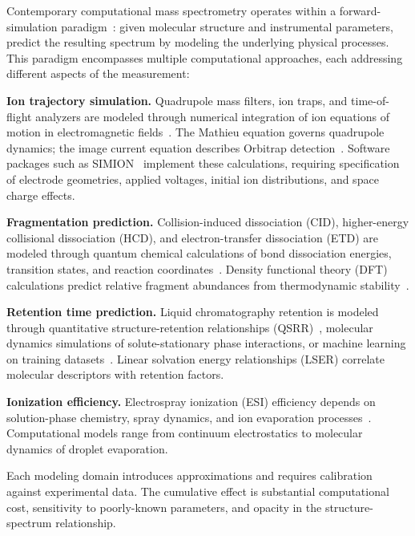 \documentclass[twocolumn,10pt]{article}
\begin{document}
Contemporary computational mass spectrometry operates within a forward-simulation paradigm~\cite{gross2011mass}: given molecular structure and instrumental parameters, predict the resulting spectrum by modeling the underlying physical processes. This paradigm encompasses multiple computational approaches, each addressing different aspects of the measurement:

\textbf{Ion trajectory simulation.} Quadrupole mass filters, ion traps, and time-of-flight analyzers are modeled through numerical integration of ion equations of motion in electromagnetic fields~\cite{march1997ion, paul1990electromagnetic}. The Mathieu equation governs quadrupole dynamics; the image current equation describes Orbitrap detection~\cite{makarov2000electrostatic}. Software packages such as SIMION~\cite{dahl2000simion} implement these calculations, requiring specification of electrode geometries, applied voltages, initial ion distributions, and space charge effects.

\textbf{Fragmentation prediction.} Collision-induced dissociation (CID), higher-energy collisional dissociation (HCD), and electron-transfer dissociation (ETD) are modeled through quantum chemical calculations of bond dissociation energies, transition states, and reaction coordinates~\cite{sleno2004ion, mcluckey1992principles}. Density functional theory (DFT) calculations predict relative fragment abundances from thermodynamic stability~\cite{allen2015competitive, wolf2010silico}.

\textbf{Retention time prediction.} Liquid chromatography retention is modeled through quantitative structure-retention relationships (QSRR)~\cite{kaliszan2007qsrr}, molecular dynamics simulations of solute-stationary phase interactions, or machine learning on training datasets~\cite{bouwmeester2019comprehensive, moruz2017peptide}. Linear solvation energy relationships (LSER) correlate molecular descriptors with retention factors.

\textbf{Ionization efficiency.} Electrospray ionization (ESI) efficiency depends on solution-phase chemistry, spray dynamics, and ion evaporation processes~\cite{fenn1989electrospray}. Computational models range from continuum electrostatics to molecular dynamics of droplet evaporation.

Each modeling domain introduces approximations and requires calibration against experimental data. The cumulative effect is substantial computational cost, sensitivity to poorly-known parameters, and opacity in the structure-spectrum relationship.
\end{document}
